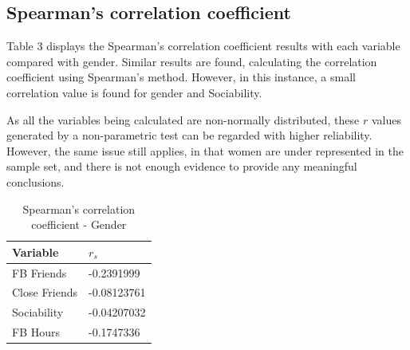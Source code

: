 \newpage
\subsection{Spearman's correlation coefficient}

Table 3 displays the Spearman's correlation coefficient results with each variable compared with gender. Similar results are found, calculating the correlation coefficient using Spearman's method. However, in this instance, a small correlation value is found for gender and Sociability.

As all the variables being calculated are non-normally distributed, these $r$ values generated by a non-parametric test can be regarded with higher reliability. However, the same issue still applies, in that women are under represented in the sample set, and there is not enough evidence to provide any meaningful conclusions.

\begin{table}[H]
\centering
\caption{Spearman's correlation coefficient - Gender}
\begin{tabular}{l|l}
Variable      & $r_s$         \\ \hline
FB Friends    & -0.2391999  \\ \hline
Close Friends & -0.08123761 \\ \hline
Sociability   & -0.04207032 \\ \hline
FB Hours      & -0.1747336  \\ \hline
\end{tabular}
\end{table}